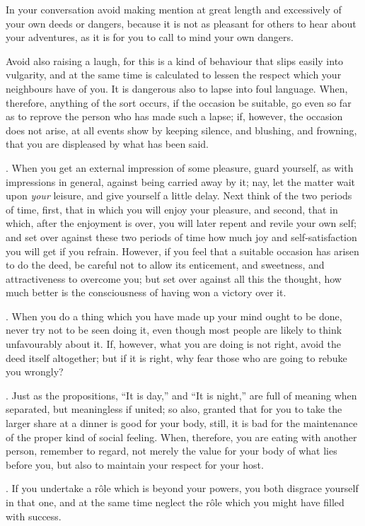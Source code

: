 In your conversation avoid making mention at great length and excessively of your own deeds or dangers, because it is not as pleasant for others to hear about your adventures, as it is for you to call to mind your own dangers.

Avoid also raising a laugh, for this is a kind of behaviour that slips easily into vulgarity, and at the same time is calculated to lessen the respect which your neighbours have of you. It is dangerous also to lapse into foul language. When, therefore, anything of the sort occurs, if the occasion be suitable, go even so far as to reprove the person who has made such a lapse; if, however, the occasion does not arise, at all events show by keeping silence, and blushing, and frowning, that you are displeased by what has been said.

. When you get an external impression of some pleasure, guard yourself, as with impressions in general, against being carried away by it; nay, let the matter wait upon \emph{your} leisure, and give yourself a little delay. Next think of the two periods of time, first, that in which you will enjoy your pleasure, and second, that in which, after the enjoyment is over, you will later repent and revile your own self; and set over against these two periods of time how much joy and self-satisfaction you will get if you refrain. However, if you feel that a suitable occasion has arisen to do the deed, be careful not to allow its enticement, and sweetness, and attractiveness to overcome you; but set over against all this the thought, how much better is the consciousness of having won a victory over it.

. When you do a thing which you have made up your mind ought to be done, never try not to be seen doing it, even though most people are likely to think unfavourably about it. If, however, what you are doing is not right, avoid the deed itself altogether; but if it is right, why fear those who are going to rebuke you wrongly?

. Just as the propositions, ``It is day,'' and ``It is night,'' are full of meaning when separated, but meaningless if united; so also, granted that for you to take the larger share at a dinner is good for your body, still, it is bad for the maintenance of the proper kind of social feeling. When, therefore, you are eating with another person, remember to regard, not merely the value for your body of what lies before you, but also to maintain your respect for your host.

. If you undertake a rôle which is beyond your powers, you both disgrace yourself in that one, and at the same time neglect the rôle which you might have filled with success.

